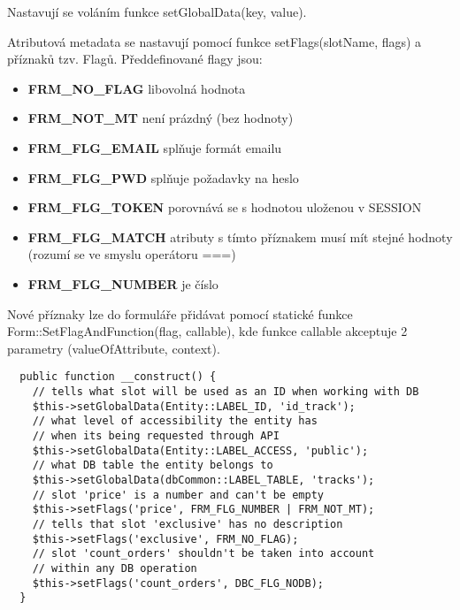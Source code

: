 \documentclass[12pt]{article}
\begin{document}
Nastavují se voláním funkce setGlobalData(key, value).

Atributová metadata se nastavují pomocí funkce setFlags(slotName, flags) a příznaků tzv. Flagů. Předdefinované flagy jsou:

\begin{itemize}
\item \textbf{FRM\_NO\_FLAG} libovolná hodnota
\item \textbf{FRM\_NOT\_MT} není prázdný (bez hodnoty)
\item \textbf{FRM\_FLG\_EMAIL} splňuje formát emailu
\item \textbf{FRM\_FLG\_PWD} splňuje požadavky na heslo
\item \textbf{FRM\_FLG\_TOKEN} porovnává se s hodnotou uloženou v SESSION
\item \textbf{FRM\_FLG\_MATCH} atributy s tímto příznakem musí mít stejné hodnoty (rozumí se ve smyslu operátoru ===)
\item \textbf{FRM\_FLG\_NUMBER} je číslo
\end{itemize}

Nové příznaky lze do formuláře přidávat pomocí statické funkce Form::SetFlagAndFunction(flag, callable), kde funkce callable akceptuje 2 parametry (valueOfAttribute, context).

\lstset{language=PHP}
\begin{lstlisting}
  public function __construct() {
    // tells what slot will be used as an ID when working with DB
    $this->setGlobalData(Entity::LABEL_ID, 'id_track');
    // what level of accessibility the entity has
    // when its being requested through API
    $this->setGlobalData(Entity::LABEL_ACCESS, 'public');
    // what DB table the entity belongs to
    $this->setGlobalData(dbCommon::LABEL_TABLE, 'tracks');
    // slot 'price' is a number and can't be empty
    $this->setFlags('price', FRM_FLG_NUMBER | FRM_NOT_MT);
    // tells that slot 'exclusive' has no description
    $this->setFlags('exclusive', FRM_NO_FLAG);
    // slot 'count_orders' shouldn't be taken into account
    // within any DB operation
    $this->setFlags('count_orders', DBC_FLG_NODB);
  }
\end{lstlisting}
\end{document}
